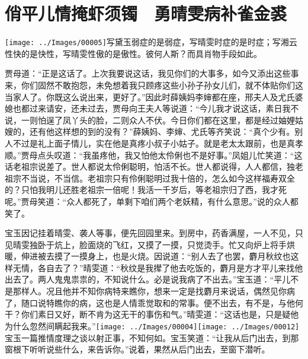 

\chapter{俏平儿情掩虾须镯　勇晴雯病补雀金裘}

{\texttt{[image: ../Images/00005]}写黛玉弱症的是弱症，写晴雯时症的是时症；写湘云性快的是快性，写晴雯性傲的是傲性。彼何人斯？而具肖物手段如此。}

贾母道：``正是这话了。上次我要说这话，我见你们的大事多，如今又添出这些事来，你们固然不敢抱怨，未免想着我只顾疼这些小孙子孙女儿们，就不体贴你们这当家人了。你既这么说出来，更好了。''因此时薛姨妈李婶都在座，邢夫人及尤氏婆媳也都过来请安，还未过去，贾母向王夫人等说道：``今儿我才说这话，素日我不说，一则怕逞了凤丫头的脸，二则众人不伏。今日你们都在这里，都是经过妯娌姑嫂的，还有他这样想的到的没有？''薛姨妈、李婶、尤氏等齐笑说：``真个少有。别人不过是礼上面子情儿，实在他是真疼小叔子小姑子。就是老太太跟前，也是真孝顺。''贾母点头叹道：``我虽疼他，我又怕他太伶俐也不是好事。''凤姐儿忙笑道：``这话老祖宗说差了。世人都说太伶俐聪明，怕活不长。世人都说得，人人都信，独老祖宗不当说，不当信。老祖宗只有伶俐聪明过我十倍的，怎么如今这样福寿双全的？只怕我明儿还胜老祖宗一倍呢！我活一千岁后，等老祖宗归了西，我才死呢。''贾母笑道：``众人都死了，单剩下咱们两个老妖精，有什么意思。''说的众人都笑了。

宝玉因记挂着晴雯、袭人等事，便先回园里来。到房中，药香满屋，一人不见，只见晴雯独卧于炕上，脸面烧的飞红，又摸了一摸，只觉烫手。忙又向炉上将手烘暖，伸进被去摸了一摸身上，也是火烧。因说道：``别人去了也罢，麝月秋纹也这样无情，各自去了？''晴雯道：``秋纹是我撵了他去吃饭的，麝月是方才平儿来找他出去了。两人鬼鬼祟祟的，不知说什么。必是说我病了不出去。''宝玉道：``平儿不是那样人。况且他并不知你病特来瞧你，想来一定是找麝月来说话，偶然见你病了，随口说特瞧你的病，这也是人情乖觉取和的常事。便不出去，有不是，与他何干？你们素日又好，断不肯为这无干的事伤和气。''晴雯道：``这话也是，只是疑他为什么忽然间瞒起我来。''{\texttt{[image: ../Images/00004]}\texttt{[image: ../Images/00012]}\footnotesize \kaishu 宝玉一篇推情度理之谈以射正事，不知何如。}宝玉笑道：``让我从后门出去，到那窗根下听听说些什么，来告诉你。''说着，果然从后门出去，至窗下潜听。

